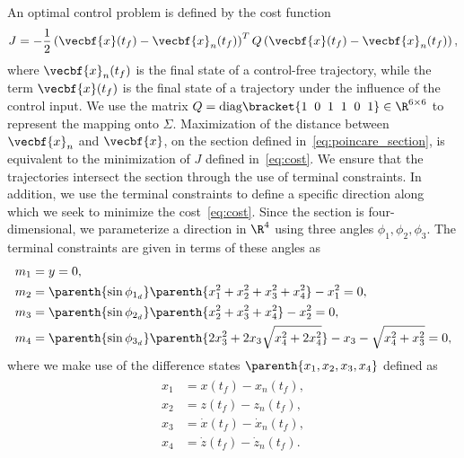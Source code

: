 An optimal control problem is defined by the cost function
\begin{align}\label{eq:cost}
    J = -\frac{1}{2} \left( \vecbf{x}(t_f) - \vecbf{x}_{n}(t_f)\right)^T 
    Q
    \left( \vecbf{x}(t_f) - \vecbf{x}_{n}(t_f)\right) ,
\end{align}
where \( \vecbf{x}_n(t_f) \) is the final state of a control-free trajectory, while the term \( \vecbf{x}(t_f)\) is the final state of a trajectory under the influence of the control input.
We use the matrix \( Q = \text{diag} \bracket{1~\>0~\> 1~\> 1~\>0~\>1 } \in \R^{6 \times 6}\) to represent the mapping onto \( \Sigma \).
Maximization of the distance between \( \vecbf{x}_n \) and \(\vecbf{x} \), on the \Poincare section defined in~\cref{eq:poincare_section}, is equivalent to the minimization of \( J \) defined in~\cref{eq:cost}.
We ensure that the trajectories intersect the \Poincare section through the use of terminal constraints.
In addition, we use the terminal constraints to define a specific direction along which we seek to minimize the cost~\cref{eq:cost}.
Since the \Poincare section is four-dimensional, we parameterize a direction in \( \R^4 \)  using three angles \( \phi_1, \phi_2 , \phi_3 \).
The terminal constraints are given in terms of these angles as
\begin{align}\label{eq:terminal_constraints}
    \begin{split}
        m_1 &= y = 0 , \\
        m_2 &= \parenth{\sin \phi_{1_{d}}} \parenth{ x_1^2 + x_2^2 + x_3^2 + x_4^2} - x_1^2 = 0, \\
        m_3 &= \parenth{\sin \phi_{2_{d}}} \parenth{ x_2^2 + x_3^2 + x_4^2} - x_2^2 = 0, \\
        m_4 &= \parenth{\sin \phi_{3_{d}}} \parenth{ 2 x_3^2 + 2 x_3 \sqrt{x_4^2 + 2 x_4^2}} - x_3 - \sqrt{x_4^2 + x_3^2} = 0 ,
    \end{split}
\end{align}
where we make use of the difference states \( \parenth{x_1, x_2 ,x_3, x_4 }\) defined as
\begin{align}\label{eq:diff_states}
    \begin{split}
        x_1 &= x(t_f) - x_n(t_f) , \\
        x_2 &= z(t_f) - z_n(t_f) , \\
        x_3 &= \dot{x}(t_f) - \dot{x}_n(t_f) , \\
        x_4 &= \dot{z}(t_f) - \dot{z}_n(t_f) . \\
    \end{split}
\end{align}
